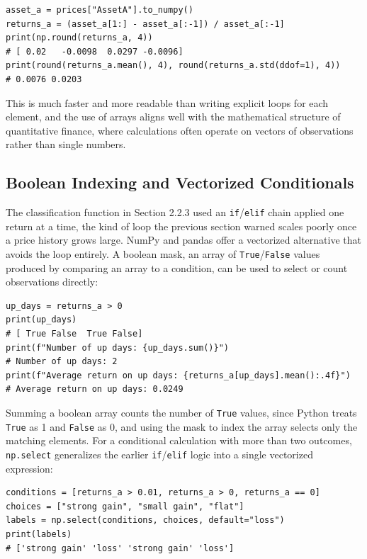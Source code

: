 \documentclass[../ai_in_finance]{subfiles}
\begin{document}
\begin{verbatim}
asset_a = prices["AssetA"].to_numpy()
returns_a = (asset_a[1:] - asset_a[:-1]) / asset_a[:-1]
print(np.round(returns_a, 4))
# [ 0.02   -0.0098  0.0297 -0.0096]
print(round(returns_a.mean(), 4), round(returns_a.std(ddof=1), 4))
# 0.0076 0.0203
\end{verbatim}

This is much faster and more readable than writing explicit loops for each element, and the use of arrays aligns well with the mathematical structure of quantitative finance, where calculations often operate on vectors of observations rather than single numbers.

\subsection{Boolean Indexing and Vectorized Conditionals}

The classification function in Section 2.2.3 used an \texttt{if}/\texttt{elif} chain applied one return at a time, the kind of loop the previous section warned scales poorly once a price history grows large. NumPy and pandas offer a vectorized alternative that avoids the loop entirely. A boolean mask, an array of \texttt{True}/\texttt{False} values produced by comparing an array to a condition, can be used to select or count observations directly:

\begin{verbatim}
up_days = returns_a > 0
print(up_days)
# [ True False  True False]
print(f"Number of up days: {up_days.sum()}")
# Number of up days: 2
print(f"Average return on up days: {returns_a[up_days].mean():.4f}")
# Average return on up days: 0.0249
\end{verbatim}

Summing a boolean array counts the number of \texttt{True} values, since Python treats \texttt{True} as 1 and \texttt{False} as 0, and using the mask to index the array selects only the matching elements. For a conditional calculation with more than two outcomes, \texttt{np.select} generalizes the earlier \texttt{if}/\texttt{elif} logic into a single vectorized expression:

\begin{verbatim}
conditions = [returns_a > 0.01, returns_a > 0, returns_a == 0]
choices = ["strong gain", "small gain", "flat"]
labels = np.select(conditions, choices, default="loss")
print(labels)
# ['strong gain' 'loss' 'strong gain' 'loss']
\end{verbatim}
\end{document}
